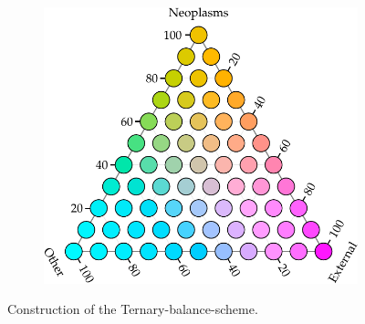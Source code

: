 \documentclass[a4paper, 12pt]{scrartcl}
\begin{document}
\begin{appendix}
\begin{figure}[!htb]
\begin{subfigure}[t]{0.3\textwidth}
  \label{fig:ternlegend}
  \end{subfigure}%
  ~
  \begin{subfigure}[t]{0.3\textwidth}
  \includegraphics[width = \textwidth]{../fig/plot-tern_balance_lgnd.pdf}
  \label{fig:tbslegend2}
  \end{subfigure}
  \caption{Con\-struc\-tion of the Ternary-balance-scheme.}
  \label{fig:tern_construction}
\end{figure}

\end{appendix}
\end{document}

